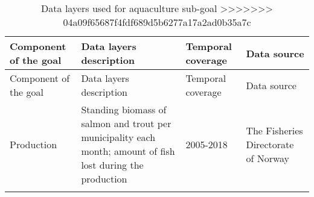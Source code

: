 \documentclass[
]{book}
\begin{document}
\begin{longtable}[]{@{}llll@{}}
\caption{\label{tab:layers} Data layers used for aquaculture sub-goal
\textgreater\textgreater\textgreater\textgreater\textgreater\textgreater\textgreater{} 04a09f65687f4fdf689d5b6277a17a2ad0b35a7c}\tabularnewline
\toprule
\begin{minipage}[b]{0.23\columnwidth}\raggedright
Component of the goal\strut
\end{minipage} & \begin{minipage}[b]{0.22\columnwidth}\raggedright
Data layers description\strut
\end{minipage} & \begin{minipage}[b]{0.25\columnwidth}\raggedright
Temporal coverage\strut
\end{minipage} & \begin{minipage}[b]{0.18\columnwidth}\raggedright
Data source\strut
\end{minipage}\tabularnewline
\midrule
\endfirsthead
\toprule
\begin{minipage}[b]{0.23\columnwidth}\raggedright
Component of the goal\strut
\end{minipage} & \begin{minipage}[b]{0.22\columnwidth}\raggedright
Data layers description\strut
\end{minipage} & \begin{minipage}[b]{0.25\columnwidth}\raggedright
Temporal coverage\strut
\end{minipage} & \begin{minipage}[b]{0.18\columnwidth}\raggedright
Data source\strut
\end{minipage}\tabularnewline
\midrule
\endhead
\begin{minipage}[t]{0.23\columnwidth}\raggedright
Production\strut
\end{minipage} & \begin{minipage}[t]{0.22\columnwidth}\raggedright
Standing biomass of salmon and trout per municipality each month; amount of fish lost during the production\strut
\end{minipage} & \begin{minipage}[t]{0.25\columnwidth}\raggedright
2005-2018\strut
\end{minipage} & \begin{minipage}[t]{0.18\columnwidth}\raggedright
The Fisheries Directorate of Norway\strut
\end{minipage}\tabularnewline
\begin{minipage}[t]{0.23\columnwidth}\raggedright

\end{minipage}
\end{longtable}
\end{document}
